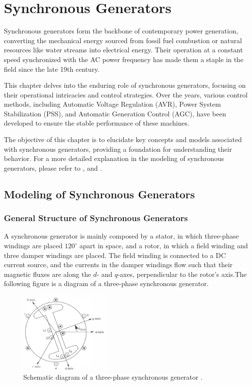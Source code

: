 \chapter{Synchronous Generators} \label{chap:sg_modeling}

Synchronous generators form the backbone of contemporary power generation,
converting the mechanical energy sourced from fossil fuel combustion or natural
resources like water streams into electrical energy. Their operation at a
constant speed synchronized with the AC power frequency has made them a staple
in the field since the late 19th century.

This chapter delves into the enduring role of synchronous generators, focusing
on their operational intricacies and control strategies. Over the years, various
control methods, including Automatic Voltage Regulation (AVR), Power System
Stabilization (PSS), and Automatic Generation Control (AGC), have been developed
to ensure the stable performance of these machines.

The objective of this chapter is to elucidate key concepts and models associated
with synchronous generators, providing a foundation for understanding their
behavior. For a more detailed explanation in the modeling of synchronous generators,
please refer to \cite{sauer2017power},\cite{krause2002analysis} and \cite{siva2022modeling}.

\section{Modeling of Synchronous Generators}
\subsection{General Structure of Synchronous Generators}

A synchronous generator is mainly composed by a stator, in which three-phase
windings are placed $120^{\circ}$ apart in space, and a rotor, in which a field
winding and three damper windings are placed. The field winding is connected to
a DC current source, and the currents in the damper windings flow such that
their magnetic fluxes are along the $d$- and $q$-axes, perpendicular to the
rotor's axis.The following figure is a diagram of a three-phase synchronous
generator.

\begin{figure}[!ht]
    \centering
    \includegraphics[width = 0.4\textwidth]{images/sg-schematic.png}
    \caption{Schematic diagram of a three-phase synchronous generator \cite{sauer2017power}.}
    \label{fig:sg-schematic}
\end{figure}

